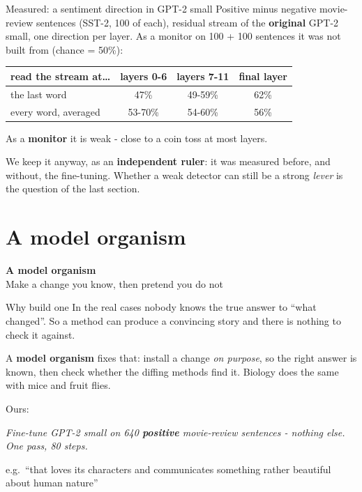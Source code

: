 \documentclass[aspectratio=169]{beamer}
\newcommand{\keybox}[1]{%
  \begin{tcolorbox}[colback=armblue!8, colframe=armblue, boxrule=0.6pt, arc=2pt]
  #1
  \end{tcolorbox}}
\newcommand{\watchbox}[1]{%
  \begin{tcolorbox}[colback=armorange!12, colframe=armorange, boxrule=0.6pt, arc=2pt]
  #1
  \end{tcolorbox}}
\newcommand{\promptbox}[1]{%
  \begin{center}
  \begin{tcolorbox}[colback=lightbg, colframe=gray, boxrule=0.5pt, arc=2pt, width=0.88\textwidth]
    \centering\textit{#1}
  \end{tcolorbox}
  \end{center}}
\newcommand{\sectiontransition}[2]{%
  \begin{frame}[plain]
    \vfill
    \begin{center}
      {\Huge\bfseries\color{popblue} #1}\\[1.1em]
      {\large #2}
    \end{center}
    \vfill
  \end{frame}}
\begin{document}
\begin{frame}{Measured: a sentiment direction in GPT-2 small}
  \vspace{0.2em}
  Positive minus negative movie-review sentences (SST-2, 100 of each), residual stream of the
  \textbf{original} GPT-2 small, one direction per layer. As a monitor on 100 + 100 sentences it
  was not built from (chance = 50\%):

  \vspace{0.1em}
  \begin{center}
  \small
  \begin{tabular}{@{}lccc@{}}
    \toprule
    read the stream at\ldots & layers 0-6 & layers 7-11 & final layer\\
    \midrule
    the last word & 47\% & 49-59\% & 62\%\\
    every word, averaged & 53-70\% & 54-60\% & 56\%\\
    \bottomrule
  \end{tabular}
  \end{center}

  \vspace{0.1em}
  \watchbox{\small As a \textbf{monitor} it is weak - close to a coin toss at most layers.}
  \vspace{-0.3em}
  \keybox{\small We keep it anyway, as an \textbf{independent ruler}: it was measured before, and
  without, the fine-tuning. Whether a weak detector can still be a strong \emph{lever} is the
  question of the last section.}
\end{frame}

\section{A model organism}
\sectiontransition{A model organism}{Make a change you know, then pretend you do not}

\begin{frame}{Why build one}
  \vspace{0.5em}
  In the real cases nobody knows the true answer to ``what changed''. So a method can produce a
  convincing story and there is nothing to check it against.

  \vspace{0.6em}
  \keybox{\small A \textbf{model organism} fixes that: install a change \emph{on purpose}, so the
  right answer is known, then check whether the diffing methods find it. Biology does the same
  with mice and fruit flies.}

  \vspace{0.6em}
  Ours:

  \vspace{0.3em}
  \promptbox{Fine-tune GPT-2 small on 640 \textbf{positive} movie-review sentences - nothing
  else. One pass, 80 steps.}

  \vspace{0.3em}
  {\footnotesize e.g.\ ``that loves its characters and communicates something rather beautiful
  about human nature''}
\end{frame}
\end{document}

